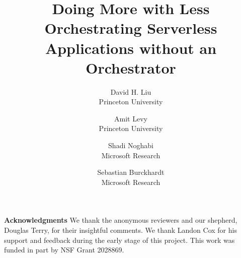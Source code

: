 \documentclass[letterpaper,twocolumn,10pt]{article}
\newcommand{\name}{Unum}
\begin{document}

\date{}

\title{Doing More with Less \\ Orchestrating Serverless Applications
without an Orchestrator}

\author{
{\rm David H. Liu}\\
Princeton University
\and
{\rm Amit Levy}\\
Princeton University
\and
{\rm Shadi Noghabi}\\
Microsoft Research
\and
{\rm Sebastian Burckhardt}\\
Microsoft Research
} %

\maketitle
\thispagestyle{empty}

\abstract{}








\setlength{\parindent}{0pt}
\setlength{\parskip}{1pt plus2pt}
\par
\textbf{Acknowledgments} We thank the anonymous reviewers and our shepherd,
Douglas Terry, for their insightful comments. We thank Landon Cox for his
support and feedback during the early stage of this project. This work was
funded in part by NSF Grant 2028869.
\setlength{\parindent}{10pt}
\setlength{\parskip}{0pt plus1pt}



\end{document}
